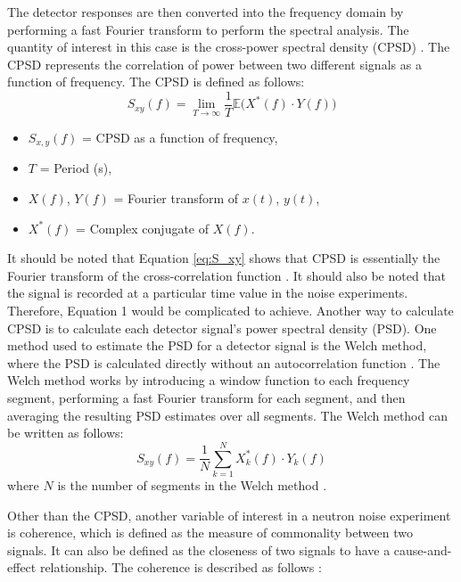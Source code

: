 The detector responses are then converted into the frequency domain by performing a fast Fourier transform to perform the spectral analysis. The quantity of interest in this case is the cross-power spectral density (CPSD) \cite{ambrozicNoiseAnalysisTechniques2020}. The CPSD represents the correlation of power between two different signals as a function of frequency. The CPSD is defined as follows:
\begin{equation}
    S_{xy}(f) = \lim_{T \rightarrow \infty} \frac{1}{T} \mathbb{E} \bigg( X^*(f) \cdot Y(f) \bigg)
    \label{eq:S_xy}
\end{equation}
\begin{itemize}
    \item[] $S_{x,y}(f)$ = CPSD as a function of frequency, 
    \item[] $T$ = Period (s), 
    \item[] $X(f)$, $Y(f)$ = Fourier transform of $x(t)$, $y(t)$, 
    \item[] $X^*(f)$ = Complex conjugate of $X(f)$. 
\end{itemize}

It should be noted that Equation \ref{eq:S_xy} shows that CPSD is essentially the Fourier transform of the cross-correlation function \cite{thiePowerReactorNoise1981}. It should also be noted that the signal is recorded at a particular time value in the noise experiments. Therefore, Equation 1 would be complicated to achieve. Another way to calculate CPSD is to calculate each detector signal’s power spectral density (PSD). One method used to estimate the PSD for a detector signal is the Welch method, where the PSD is calculated directly without an autocorrelation function \cite{welchDirectDigitalMethod1961}. The Welch method works by introducing a window function to each frequency segment, performing a fast Fourier transform for each segment, and then averaging the resulting PSD estimates over all segments. The Welch method can be written as follows:
\begin{equation}
    S_{xy}(f) = \frac{1}{N} \sum_{k=1}^{N} X_k^*(f) \cdot Y_k(f)
\end{equation}
where $N$ is the number of segments in the Welch method \cite{ambrozicNoiseAnalysisTechniques2020}.

Other than the CPSD, another variable of interest in a neutron noise experiment is coherence, which is defined as the measure of commonality between two signals. It can also be defined as the closeness of two signals to have a cause-and-effect relationship. The coherence is described as follows \cite{fryAnalysisNeutrondensityOscillations1975}:

